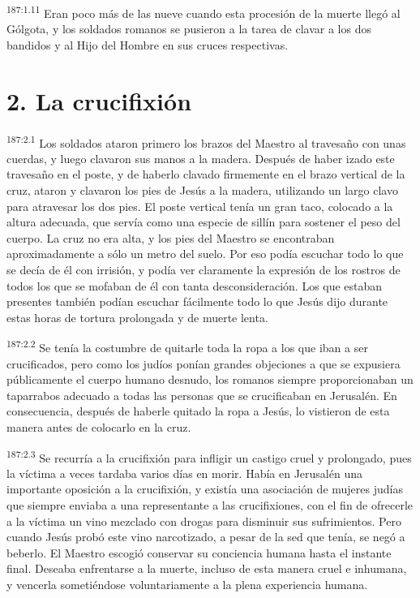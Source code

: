 \par 
\textsuperscript{187:1.11} Eran poco más de las nueve cuando esta procesión de la muerte llegó al Gólgota, y los soldados romanos se pusieron a la tarea de clavar a los dos bandidos y al Hijo del Hombre en sus cruces respectivas.

\section*{2. La crucifixión}
\par 
\textsuperscript{187:2.1} Los soldados ataron primero los brazos del Maestro al travesaño con unas cuerdas, y luego clavaron sus manos a la madera. Después de haber izado este travesaño en el poste, y de haberlo clavado firmemente en el brazo vertical de la cruz, ataron y clavaron los pies de Jesús a la madera, utilizando un largo clavo para atravesar los dos pies. El poste vertical tenía un gran taco, colocado a la altura adecuada, que servía como una especie de sillín para sostener el peso del cuerpo. La cruz no era alta, y los pies del Maestro se encontraban aproximadamente a sólo un metro del suelo. Por eso podía escuchar todo lo que se decía de él con irrisión, y podía ver claramente la expresión de los rostros de todos los que se mofaban de él con tanta desconsideración. Los que estaban presentes también podían escuchar fácilmente todo lo que Jesús dijo durante estas horas de tortura prolongada y de muerte lenta.

\par 
\textsuperscript{187:2.2} Se tenía la costumbre de quitarle toda la ropa a los que iban a ser crucificados, pero como los judíos ponían grandes objeciones a que se expusiera públicamente el cuerpo humano desnudo, los romanos siempre proporcionaban un taparrabos adecuado a todas las personas que se crucificaban en Jerusalén. En consecuencia, después de haberle quitado la ropa a Jesús, lo vistieron de esta manera antes de colocarlo en la cruz.

\par 
\textsuperscript{187:2.3} Se recurría a la crucifixión para infligir un castigo cruel y prolongado, pues la víctima a veces tardaba varios días en morir. Había en Jerusalén una importante oposición a la crucifixión, y existía una asociación de mujeres judías que siempre enviaba a una representante a las crucifixiones, con el fin de ofrecerle a la víctima un vino mezclado con drogas para disminuir sus sufrimientos. Pero cuando Jesús probó este vino narcotizado, a pesar de la sed que tenía, se negó a beberlo. El Maestro escogió conservar su conciencia humana hasta el instante final. Deseaba enfrentarse a la muerte, incluso de esta manera cruel e inhumana, y vencerla sometiéndose voluntariamente a la plena experiencia humana.


